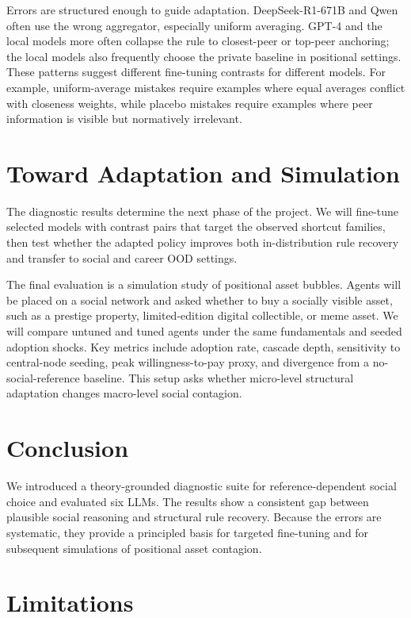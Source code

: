 \documentclass[11pt]{article}
\begin{document}
Errors are structured enough to guide adaptation.
DeepSeek-R1-671B and Qwen often use the wrong aggregator, especially uniform averaging.
GPT-4 and the local models more often collapse the rule to closest-peer or top-peer anchoring; the local models also frequently choose the private baseline in positional settings.
These patterns suggest different fine-tuning contrasts for different models.
For example, uniform-average mistakes require examples where equal averages conflict with closeness weights, while placebo mistakes require examples where peer information is visible but normatively irrelevant.

\section{Toward Adaptation and Simulation}

The diagnostic results determine the next phase of the project.
We will fine-tune selected models with contrast pairs that target the observed shortcut families, then test whether the adapted policy improves both in-distribution rule recovery and transfer to social and career OOD settings.

The final evaluation is a simulation study of positional asset bubbles.
Agents will be placed on a social network and asked whether to buy a socially visible asset, such as a prestige property, limited-edition digital collectible, or meme asset.
We will compare untuned and tuned agents under the same fundamentals and seeded adoption shocks.
Key metrics include adoption rate, cascade depth, sensitivity to central-node seeding, peak willingness-to-pay proxy, and divergence from a no-social-reference baseline.
This setup asks whether micro-level structural adaptation changes macro-level social contagion.

\section{Conclusion}

We introduced a theory-grounded diagnostic suite for reference-dependent social choice and evaluated six LLMs.
The results show a consistent gap between plausible social reasoning and structural rule recovery.
Because the errors are systematic, they provide a principled basis for targeted fine-tuning and for subsequent simulations of positional asset contagion.

\section*{Limitations}
\end{document}
